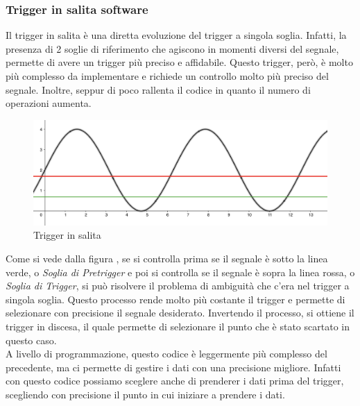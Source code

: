 \subsubsection{Trigger in salita software}
Il trigger in salita è una diretta evoluzione del trigger a singola soglia. Infatti, la presenza di 2 soglie di riferimento che agiscono in momenti diversi del segnale, permette di avere un trigger più preciso e affidabile. Questo trigger, però, è molto più complesso da implementare e richiede un controllo molto più preciso del segnale. Inoltre, seppur di poco rallenta il codice in quanto il numero di operazioni aumenta.

\begin{figure}
    \centering
    \includegraphics[width=\linewidth]{oscilloscopio/assets/trigger.png}
    \caption{Trigger in salita}
    \label{fig:Trigger}
\end{figure}

Come si vede dalla figura \hypersetup{linkcolor=black}{\ref{fig:Trigger}}, se si controlla prima se il segnale è sotto la linea verde, o \textit{Soglia di Pretrigger} e poi si controlla se il segnale è sopra la linea rossa, o \textit{Soglia di Trigger}, si può risolvere il problema di ambiguità che c'era nel trigger a singola soglia. Questo processo rende molto più costante il trigger e permette di selezionare con precisione il segnale desiderato.
Invertendo il processo, si ottiene il trigger in discesa, il quale permette di selezionare il punto che è stato scartato in questo caso.\\

A livello di programmazione, questo codice è leggermente più complesso del precedente, ma ci permette di gestire i dati con una precisione migliore. Infatti con questo codice possiamo sceglere anche di prenderer i dati prima del trigger, scegliendo con precisione il punto in cui iniziare a prendere i dati.

